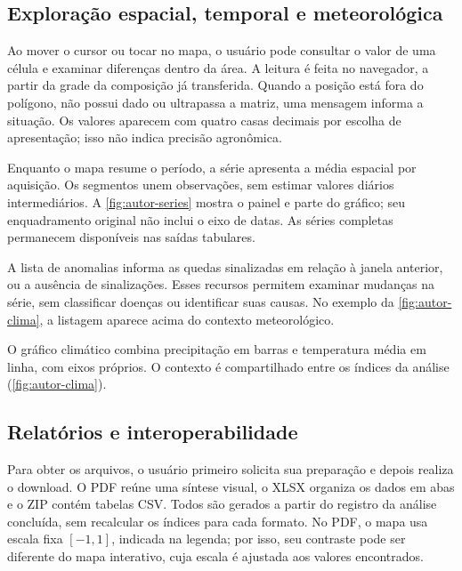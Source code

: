 
\subsection{Exploração espacial, temporal e meteorológica}

Ao mover o cursor ou tocar no mapa, o usuário pode consultar o valor de uma célula e examinar diferenças dentro da área. A leitura é feita no navegador, a partir da grade da composição já transferida. Quando a posição está fora do polígono, não possui dado ou ultrapassa a matriz, uma mensagem informa a situação. Os valores aparecem com quatro casas decimais por escolha de apresentação; isso não indica precisão agronômica.

Enquanto o mapa resume o período, a série apresenta a média espacial por aquisição. Os segmentos unem observações, sem estimar valores diários intermediários. A \cref{fig:autor-series} mostra o painel e parte do gráfico; seu enquadramento original não inclui o eixo de datas. As séries completas permanecem disponíveis nas saídas tabulares.


A lista de anomalias informa as quedas sinalizadas em relação à janela anterior, ou a ausência de sinalizações. Esses recursos permitem examinar mudanças na série, sem classificar doenças ou identificar suas causas. No exemplo da \cref{fig:autor-clima}, a listagem aparece acima do contexto meteorológico.

O gráfico climático combina precipitação em barras e temperatura média em linha, com eixos próprios. O contexto é compartilhado entre os índices da análise (\cref{fig:autor-clima}).


\subsection{Relatórios e interoperabilidade}

Para obter os arquivos, o usuário primeiro solicita sua preparação e depois realiza o download. O PDF reúne uma síntese visual, o XLSX organiza os dados em abas e o ZIP contém tabelas CSV. Todos são gerados a partir do registro da análise concluída, sem recalcular os índices para cada formato. No PDF, o mapa usa escala fixa $[-1,1]$, indicada na legenda; por isso, seu contraste pode ser diferente do mapa interativo, cuja escala é ajustada aos valores encontrados.

